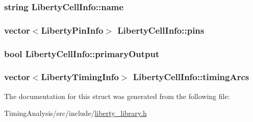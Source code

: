 \hypertarget{structLibertyCellInfo_a50066e7ef4d4110f6751bb9d81079614}{
\subsubsection[{name}]{\setlength{\rightskip}{0pt plus 5cm}string Liberty\-Cell\-Info\-::name}}\label{structLibertyCellInfo_a50066e7ef4d4110f6751bb9d81079614}
\hypertarget{structLibertyCellInfo_a521bb57132e935e3a1db03227dc6345b}{
\subsubsection[{pins}]{\setlength{\rightskip}{0pt plus 5cm}vector$<${\bf Liberty\-Pin\-Info}$>$ Liberty\-Cell\-Info\-::pins}}\label{structLibertyCellInfo_a521bb57132e935e3a1db03227dc6345b}
\hypertarget{structLibertyCellInfo_a20420db0c6e78453236b10a62478f4e8}{
\subsubsection[{primary\-Output}]{\setlength{\rightskip}{0pt plus 5cm}bool Liberty\-Cell\-Info\-::primary\-Output}}\label{structLibertyCellInfo_a20420db0c6e78453236b10a62478f4e8}
\hypertarget{structLibertyCellInfo_a28e5986b7cbdee33fbed50f4cb54c005}{
\subsubsection[{timing\-Arcs}]{\setlength{\rightskip}{0pt plus 5cm}vector$<${\bf Liberty\-Timing\-Info}$>$ Liberty\-Cell\-Info\-::timing\-Arcs}}\label{structLibertyCellInfo_a28e5986b7cbdee33fbed50f4cb54c005}


The documentation for this struct was generated from the following file\-:\begin{DoxyCompactItemize}
\item 
Timing\-Analysis/src/include/\hyperlink{liberty__library_8h}{liberty\-\_\-library.\-h}\end{DoxyCompactItemize}
